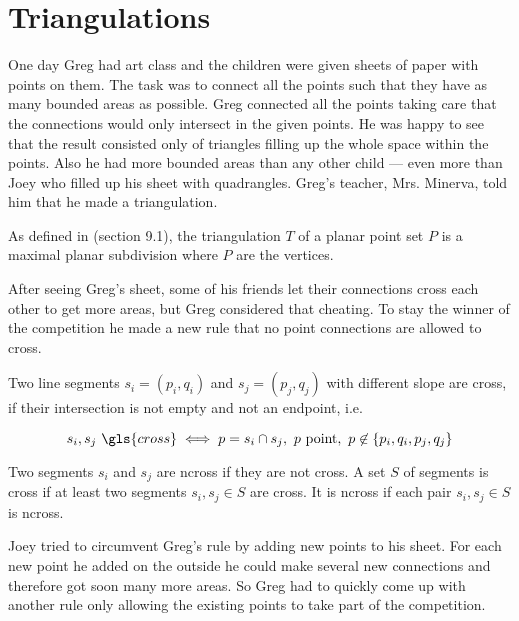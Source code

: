\chapter{Triangulations}
One day Greg had art class and the children were given sheets of
paper with points on them. The task was to connect all the points 
such that they have as many bounded areas as possible. Greg 
connected all the points taking care that the connections would only 
intersect in the given points. He was happy to see that the result 
consisted only of triangles filling up the whole space within the 
points. Also he had more bounded areas than any other child --- 
even more than Joey who filled up his sheet with quadrangles. Greg's
teacher, Mrs. Minerva, told him that he made a triangulation.

\begin{definition}[Triangulation]\label{def:triangulation_subdivision}
As defined in \cite{deberg_compgeom} (section 9.1), the
triangulation \(T\) of a planar point set \(P\) is a maximal planar 
subdivision where \(P\) are the vertices.
\end{definition}

After seeing Greg's sheet, some of his friends let their connections
cross each other to get more areas, but Greg considered that
cheating. To stay the winner of the competition he made a new rule
that no point connections are allowed to cross.

\begin{definition}[Crossing]\label{def:crossing}
Two line segments \(s_i=(p_i,q_i)\) and \(s_j=(p_j,q_j)\) with 
different slope are \gls{cross}, if their intersection is not empty
and not an endpoint, i.e.

\[
  s_i, s_j~\gls{cross}
  \iff
  p = s_i\cap s_j,~
  p~\text{point},~
  p \not\in \{p_i,q_i,p_j,q_j\} \]

Two segments \(s_i\) and \(s_j\) are \gls{ncross} if they are
not \gls{cross}. A set \(S\) of segments is \gls{cross} if at least
two segments \(s_i, s_j \in S\) are \gls{cross}. It is \gls{ncross}
if each pair \(s_i, s_j \in S\) is \gls{ncross}.
\end{definition}

Joey tried to circumvent Greg's rule by adding new points to his
sheet. For each new point he added on the outside he could make
several new connections and therefore got soon many more areas. So
Greg had to quickly come up with another rule only allowing the
existing points to take part of the competition.

